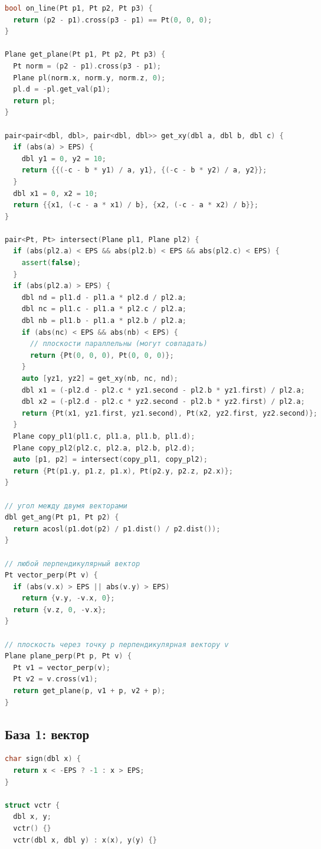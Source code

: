 \documentclass[9pt,a4paper,landscape,twosided]{extarticle}
\begin{document}
\begin{multicols*}{3}
\begin{lstlisting}[language=C++]
bool on_line(Pt p1, Pt p2, Pt p3) {
  return (p2 - p1).cross(p3 - p1) == Pt(0, 0, 0);
}

Plane get_plane(Pt p1, Pt p2, Pt p3) {
  Pt norm = (p2 - p1).cross(p3 - p1);
  Plane pl(norm.x, norm.y, norm.z, 0);
  pl.d = -pl.get_val(p1);
  return pl;
}

pair<pair<dbl, dbl>, pair<dbl, dbl>> get_xy(dbl a, dbl b, dbl c) {
  if (abs(a) > EPS) {
    dbl y1 = 0, y2 = 10;
    return {{(-c - b * y1) / a, y1}, {(-c - b * y2) / a, y2}};
  }
  dbl x1 = 0, x2 = 10;
  return {{x1, (-c - a * x1) / b}, {x2, (-c - a * x2) / b}};
}

pair<Pt, Pt> intersect(Plane pl1, Plane pl2) {
  if (abs(pl2.a) < EPS && abs(pl2.b) < EPS && abs(pl2.c) < EPS) {
    assert(false);
  }
  if (abs(pl2.a) > EPS) {
    dbl nd = pl1.d - pl1.a * pl2.d / pl2.a;
    dbl nc = pl1.c - pl1.a * pl2.c / pl2.a;
    dbl nb = pl1.b - pl1.a * pl2.b / pl2.a;
    if (abs(nc) < EPS && abs(nb) < EPS) {
      // плоскости параллельны (могут совпадать)
      return {Pt(0, 0, 0), Pt(0, 0, 0)};
    }
    auto [yz1, yz2] = get_xy(nb, nc, nd);
    dbl x1 = (-pl2.d - pl2.c * yz1.second - pl2.b * yz1.first) / pl2.a;
    dbl x2 = (-pl2.d - pl2.c * yz2.second - pl2.b * yz2.first) / pl2.a;
    return {Pt(x1, yz1.first, yz1.second), Pt(x2, yz2.first, yz2.second)};
  }
  Plane copy_pl1(pl1.c, pl1.a, pl1.b, pl1.d);
  Plane copy_pl2(pl2.c, pl2.a, pl2.b, pl2.d);
  auto [p1, p2] = intersect(copy_pl1, copy_pl2);
  return {Pt(p1.y, p1.z, p1.x), Pt(p2.y, p2.z, p2.x)};
}

// угол между двумя векторами
dbl get_ang(Pt p1, Pt p2) {
  return acosl(p1.dot(p2) / p1.dist() / p2.dist());
}

// любой перпендикулярный вектор
Pt vector_perp(Pt v) {
  if (abs(v.x) > EPS || abs(v.y) > EPS)
    return {v.y, -v.x, 0};
  return {v.z, 0, -v.x};
}

// плоскость через точку p перпендикулярная вектору v
Plane plane_perp(Pt p, Pt v) {
  Pt v1 = vector_perp(v);
  Pt v2 = v.cross(v1);
  return get_plane(p, v1 + p, v2 + p);
}
\end{lstlisting}

\subsection{База 1: вектор}
\begin{lstlisting}[language=C++]
char sign(dbl x) {
  return x < -EPS ? -1 : x > EPS;
}

struct vctr {
  dbl x, y;
  vctr() {}
  vctr(dbl x, dbl y) : x(x), y(y) {}


\end{lstlisting}
\end{multicols*}
\end{document}
